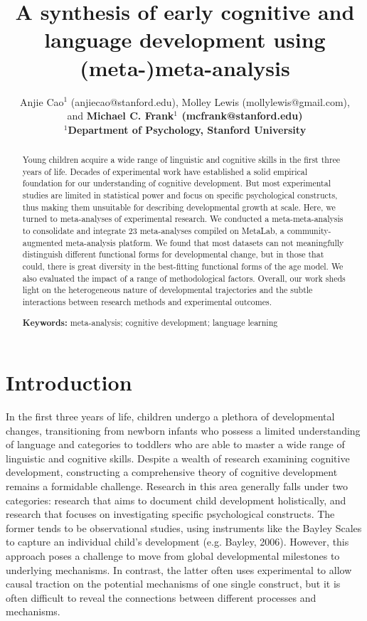 \documentclass[10pt, letterpaper]{article}
\title{A synthesis of early cognitive and language development using
(meta-)meta-analysis}
\author{Anjie Cao$^1$  (anjiecao@stanford.edu), 
 Molley Lewis (mollylewis@gmail.com), \\
 and \bf{Michael C. Frank$^1$ (mcfrank@stanford.edu)} \\
$^1$Department of Psychology, Stanford University }
\begin{document}
\maketitle

\begin{abstract}
Young children acquire a wide range of linguistic and cognitive skills
in the first three years of life. Decades of experimental work have
established a solid empirical foundation for our understanding of
cognitive development. But most experimental studies are limited in
statistical power and focus on specific psychological constructs, thus
making them unsuitable for describing developmental growth at scale.
Here, we turned to meta-analyses of experimental research. We conducted
a meta-meta-analysis to consolidate and integrate 23 meta-analyses
compiled on MetaLab, a community-augmented meta-analysis platform. We
found that most datasets can not meaningfully distinguish different
functional forms for developmental change, but in those that could,
there is great diversity in the best-fitting functional forms of the age
model. We also evaluated the impact of a range of methodological
factors. Overall, our work sheds light on the heterogeneous nature of
developmental trajectories and the subtle interactions between research
methods and experimental outcomes.

\textbf{Keywords:}
meta-analysis; cognitive development; language learning
\end{abstract}

\hypertarget{introduction}{%
\section{Introduction}\label{introduction}}

In the first three years of life, children undergo a plethora of
developmental changes, transitioning from newborn infants who possess a
limited understanding of language and categories to toddlers who are
able to master a wide range of linguistic and cognitive skills. Despite
a wealth of research examining cognitive development, constructing a
comprehensive theory of cognitive development remains a formidable
challenge. Research in this area generally falls under two categories:
research that aims to document child development holistically, and
research that focuses on investigating specific psychological
constructs. The former tends to be observational studies, using
instruments like the Bayley Scales to capture an individual child's
development (e.g. Bayley, 2006). However, this approach poses a
challenge to move from global developmental milestones to underlying
mechanisms. In contrast, the latter often uses experimental to allow
causal traction on the potential mechanisms of one single construct, but
it is often difficult to reveal the connections between different
processes and mechanisms.
\end{document}
